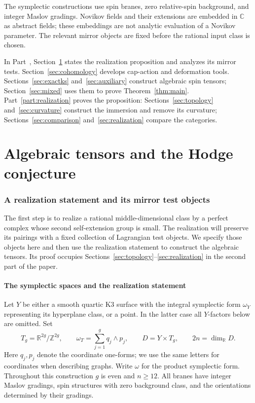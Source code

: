 \documentclass[11pt]{article}
\numberwithin{equation}{section}
\theoremstyle{definition}
\theoremstyle{remark}
\begin{document}
The symplectic constructions use spin branes, zero relative-spin
background, and integer Maslov gradings.  Novikov fields and their
extensions are embedded in \(\mathbb C\) as abstract fields; these embeddings
are not analytic evaluation of a Novikov parameter.  The relevant
mirror objects are fixed before the rational input class is chosen.

In Part~\ref{part:algebraic}, Section~\ref{sec:setup} states the
realization proposition and analyzes its mirror tests.
Section~\ref{sec:cohomology} develops cap-action and deformation tools.
Sections~\ref{sec:exactks} and~\ref{sec:auxiliary} construct algebraic
spin tensors; Section~\ref{sec:mixed} uses them to prove
Theorem~\ref{thm:main}.  Part~\ref{part:realization} proves the proposition:
Sections~\ref{sec:topology} and~\ref{sec:curvature} construct the
immersion and remove its curvature; Sections~\ref{sec:comparison}
and~\ref{sec:realization} compare the categories.


\part{Algebraic tensors and the Hodge conjecture}
\label{part:algebraic}
\section{A realization statement and its mirror test objects}
\label{sec:setup}

The first step is to realize a rational middle-dimensional class by a
perfect complex whose second self-extension group is small.  The
realization will preserve its pairings with a fixed collection of
Lagrangian test objects.  We specify those objects here and then use the
realization statement to construct the algebraic tensors.  Its proof occupies
Sections~\ref{sec:topology}--\ref{sec:realization} in the second part
of the paper.

\subsection{The symplectic spaces and the realization statement}

Let $Y$ be either a smooth quartic K3 surface with the integral
symplectic form $\omega_Y$ representing its hyperplane class, or a point.
In the latter case all $Y$-factors below are omitted.  Set
\begin{equation}
 T_g=\mathbb R^{2g}/\mathbb Z^{2g},\qquad
 \omega_T=\sum_{j=1}^g q_j\wedge p_j,\qquad
 D=Y\times T_g,\qquad 2n=\dim_{\mathbb R}D.
 \label{setup:spaces}
\end{equation}
Here $q_j,p_j$ denote the coordinate one-forms; we use the same letters
for coordinates when describing graphs.  Write $\omega$ for the product
symplectic form.  Throughout this construction $g$ is even and $n\ge12$.
All branes have integer Maslov gradings, spin structures with zero
background class, and the orientations determined by their gradings.
\end{document}
